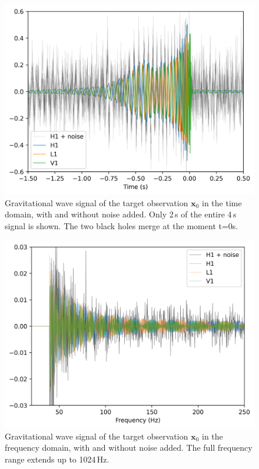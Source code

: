 \begin{figure}[tb]
  \centering
  \includegraphics[width=1\linewidth]{media/images/obs_time_domain_lowSNR.png}
  \caption{Gravitational wave signal of the target observation $\boldsymbol{x}_0$ in the time domain, with and without noise added. Only 2\,s of the entire 4\,s signal is shown. The two black holes merge at the moment t=0s.}
  \label{fig:obs_time_domain}
\end{figure}

\begin{figure}[tb]
  \centering
  \includegraphics[width=1\linewidth]{media/images/obs_freq_domain_lowSNR.png}
  \caption{Gravitational wave signal of the target observation $\boldsymbol{x}_0$ in the frequency domain, with and without noise added. The full frequency range extends up to 1024\,Hz.}
  \label{fig:obs_freq_domain}
\end{figure}

